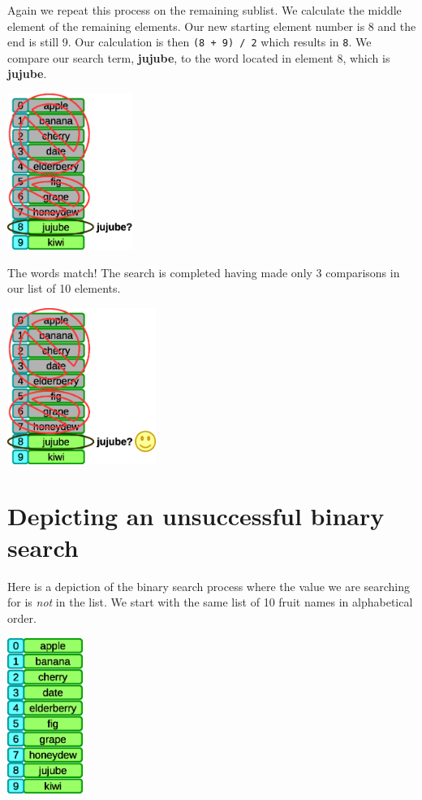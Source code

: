 Again we repeat this process on the remaining sublist. We calculate the middle element of the remaining elements. Our new starting element number is 8 and the end is still 9. Our calculation is then \texttt{(8 + 9) / 2} which results in \texttt{8}. We compare our search term, \textbf{jujube}, to the word located in element 8, which is \textbf{jujube}.

\beforefig
\centerline{\includegraphics[height=2in]{figs2/recursion-binsearch-success-5.eps}}
\afterfig

The words match! The search is completed having made only 3 comparisons in our list of 10 elements.

\beforefig
\centerline{\includegraphics[height=2in]{figs2/recursion-binsearch-success-6.eps}}
\afterfig

\section{Depicting an unsuccessful binary search}

Here is a depiction of the binary search process where the value we are searching for is \textit{not} in the list. We start with the same list of 10 fruit names in alphabetical order. 

\beforefig
\centerline{\includegraphics[height=2in]{figs2/recursion-binsearch-initiallist.eps}}
\afterfig

